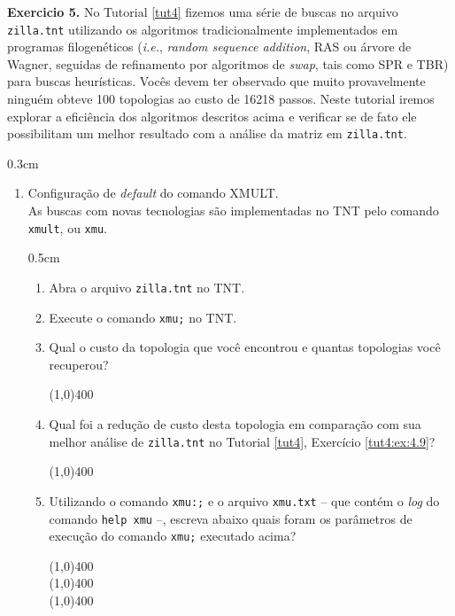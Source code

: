 \begin{refsection}
\begin{blackBlock}{\textbf{Exercicio 5.}}\label{tut4:ex:5.1}
No Tutorial \ref{tut4} fizemos uma série de buscas no arquivo \texttt{zilla.tnt} utilizando os algoritmos tradicionalmente implementados em programas filogenéticos (\textit{i.e.}, \textit{random sequence addition}, RAS ou árvore de Wagner, seguidas de refinamento por algoritmos de \textit{swap}, tais como SPR e TBR) para buscas heurísticas. Vocês devem ter observado que muito provavelmente ninguém obteve 100 topologias ao custo de 16218 passos. Neste tutorial iremos explorar a eficiência dos algoritmos descritos acima e verificar se de fato ele possibilitam um melhor resultado com a análise da matriz em \texttt{zilla.tnt}.
\end{blackBlock}

\begin {myindentpar}{0.3cm}
\begin{enumerate}[\itshape i.]

	\item{Configuração de \textit{default} do comando XMULT.}\\
	As buscas com novas tecnologias são implementadas no TNT pelo comando \texttt{xmult}, ou \texttt{xmu}. 
	  \begin {myindentpar}{0.5cm}
	  \begin{enumerate}[\itshape a.]
		\item{Abra o arquivo \texttt{zilla.tnt} no TNT}.
		\item{Execute o comando \texttt{xmu;} no TNT}.
		\item{Qual o custo da topologia que você encontrou e quantas topologias você recuperou?}
			\begin{center}
			\line(1,0){400}\\
			\end{center}
		\item{Qual foi a redução de custo desta topologia em comparação com sua melhor análise de \texttt{zilla.tnt} no Tutorial \ref{tut4}, Exercício \ref{tut4:ex:4.9}?}
			\begin{center}
			\line(1,0){400}\\
			\end{center}
		\item{Utilizando o comando \texttt{xmu:;} e o arquivo \texttt{xmu.txt} -- que contém o \textit{log} do comando \texttt{help xmu} --, escreva abaixo quais foram os parâmetros de execução do comando \texttt{xmu;} executado acima?}
			\begin{center}
			\line(1,0){400}\\
			\line(1,0){400}\\
			\line(1,0){400}\\
			\end{center}
	  \end{enumerate}
	  \end{myindentpar}


\end{enumerate}
\end{myindentpar}
\end{refsection}
